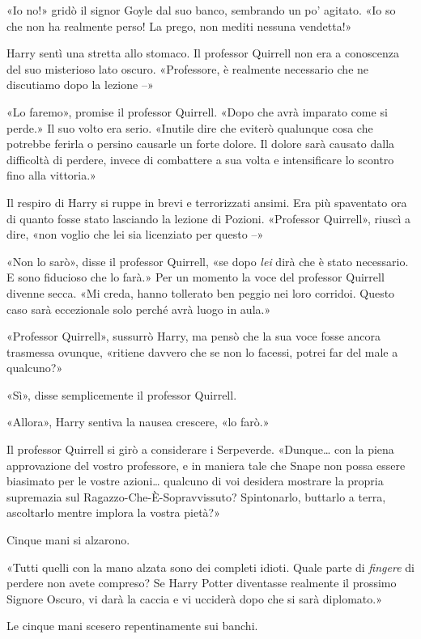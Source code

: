 «Io no!» gridò il signor Goyle dal suo banco, sembrando un po’ agitato. «Io so che non ha realmente perso! La prego, non mediti nessuna vendetta!»

Harry sentì una stretta allo stomaco. Il professor Quirrell non era a conoscenza del suo misterioso lato oscuro. «Professore, è realmente necessario che ne discutiamo dopo la lezione –»

«Lo faremo», promise il professor Quirrell. «Dopo che avrà imparato come si perde.» Il suo volto era serio. «Inutile dire che eviterò qualunque cosa che potrebbe ferirla o persino causarle un forte dolore. Il dolore sarà causato dalla difficoltà di perdere, invece di combattere a sua volta e intensificare lo scontro fino alla vittoria.»

Il respiro di Harry si ruppe in brevi e terrorizzati ansimi. Era più spaventato ora di quanto fosse stato lasciando la lezione di Pozioni. «Professor Quirrell», riuscì a dire, «non voglio che lei sia licenziato per questo –»

«Non lo sarò», disse il professor Quirrell, «se dopo \textit{lei} dirà che è stato necessario. E sono fiducioso che lo farà.» Per un momento la voce del professor Quirrell divenne secca. «Mi creda, hanno tollerato ben peggio nei loro corridoi. Questo caso sarà eccezionale solo perché avrà luogo in aula.»

«Professor Quirrell», sussurrò Harry, ma pensò che la sua voce fosse ancora trasmessa ovunque, «ritiene davvero che se non lo facessi, potrei far del male a qualcuno?»

«Sì», disse semplicemente il professor Quirrell.

«Allora», Harry sentiva la nausea crescere, «lo farò.»

Il professor Quirrell si girò a considerare i Serpeverde. «Dunque… con la piena approvazione del vostro professore, e in maniera tale che Snape non possa essere biasimato per le vostre azioni… qualcuno di voi desidera mostrare la propria supremazia sul Ragazzo-Che-È-Sopravvissuto? Spintonarlo, buttarlo a terra, ascoltarlo mentre implora la vostra pietà?»

Cinque mani si alzarono.

«Tutti quelli con la mano alzata sono dei completi idioti. Quale parte di \textit{fingere} di perdere non avete compreso? Se Harry Potter diventasse realmente il prossimo Signore Oscuro, vi darà la caccia e vi ucciderà dopo che si sarà diplomato.»

Le cinque mani scesero repentinamente sui banchi.

